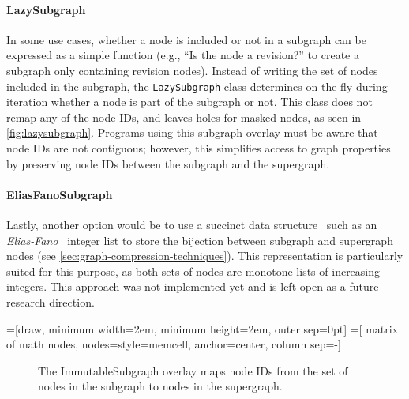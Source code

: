 \paragraph{LazySubgraph}
In some use cases, whether a node is included or not in a subgraph can be
expressed as a simple function (e.g., ``Is the node a revision?'' to create a
subgraph only containing revision nodes). Instead of writing the set of nodes
included in the subgraph, the \texttt{LazySubgraph} class determines on the fly
during iteration whether a node is part of the subgraph or not. This class does
not remap any of the node IDs, and leaves holes for masked nodes, as seen in
\cref{fig:lazysubgraph}. Programs using this subgraph overlay must be aware
that node IDs are not contiguous; however, this simplifies access to graph
properties by preserving node IDs between the subgraph and the supergraph.

\paragraph{EliasFanoSubgraph}
Lastly, another option would be to use a succinct data structure~\cite{NavCDS}
such as an \emph{Elias-Fano}~\cite{EliESRCASF} integer list to store the
bijection between subgraph and supergraph nodes (see
\cref{sec:graph-compression-techniques}). This representation is particularly
suited for this purpose, as both sets of nodes are monotone lists of increasing
integers. This approach was not implemented yet and is left open as a future
research direction.

=[draw, minimum width=2em, minimum height=2em, outer sep=0pt]
=[
    matrix of math nodes,
    nodes={style=memcell, anchor=center},
    column sep=-\pgflinewidth]

\begin{figure}
    \centering
    \caption{The ImmutableSubgraph overlay maps node IDs from the set of nodes
    in the subgraph to nodes in the supergraph.}%
    \label{fig:immutablesubgraph}
\end{figure}

